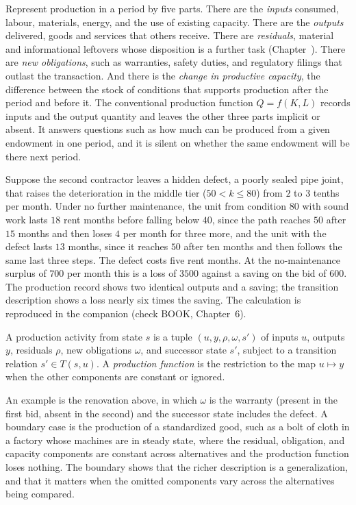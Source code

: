 Represent production in a period by five parts. There are the \emph{inputs} consumed, labour, materials, energy, and the use of existing capacity. There are the \emph{outputs} delivered, goods and services that others receive. There are \emph{residuals}, material and informational leftovers whose disposition is a further task (Chapter~). There are \emph{new obligations}, such as warranties, safety duties, and regulatory filings that outlast the transaction. And there is the \emph{change in productive capacity}, the difference between the stock of conditions that supports production after the period and before it. The conventional production function $Q=f(K,L)$ records inputs and the output quantity and leaves the other three parts implicit or absent. It answers questions such as how much can be produced from a given endowment in one period, and it is silent on whether the same endowment will be there next period.

Suppose the second contractor leaves a hidden defect, a poorly sealed pipe joint, that raises the deterioration in the middle tier ($50<k\le 80$) from $2$ to $3$ tenths per month. Under no further maintenance, the unit from condition $80$ with sound work lasts $18$ rent months before falling below $40$, since the path reaches $50$ after $15$ months and then loses $4$ per month for three more, and the unit with the defect lasts $13$ months, since it reaches $50$ after ten months and then follows the same last three steps. The defect costs five rent months. At the no-maintenance surplus of $700$ per month this is a loss of $3500$ against a saving on the bid of $600$. The production record shows two identical outputs and a saving; the transition description shows a loss nearly six times the saving. The calculation is reproduced in the companion (check BOOK, Chapter~6).

\begin{definition}\label{def:transition-prod}
A production activity from state $s$ is a tuple $(u,y,\rho,\omega,s')$ of inputs $u$, outputs $y$, residuals $\rho$, new obligations $\omega$, and successor state $s'$, subject to a transition relation $s'\in T(s,u)$. A \emph{production function} is the restriction to the map $u\mapsto y$ when the other components are constant or ignored.
\end{definition}

An example is the renovation above, in which $\omega$ is the warranty (present in the first bid, absent in the second) and the successor state includes the defect. A boundary case is the production of a standardized good, such as a bolt of cloth in a factory whose machines are in steady state, where the residual, obligation, and capacity components are constant across alternatives and the production function loses nothing. The boundary shows that the richer description is a generalization, and that it matters when the omitted components vary across the alternatives being compared.

